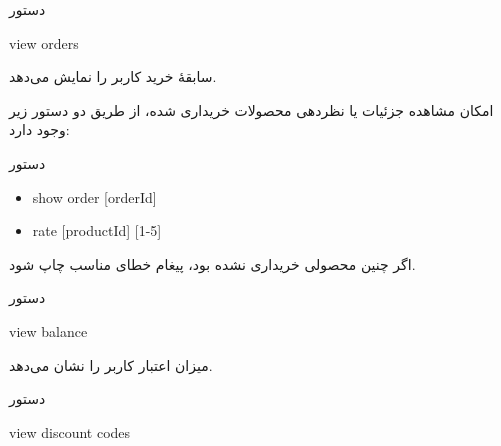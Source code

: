 \documentclass[]{article}
\begin{document}
\hrulefill


\begin{mybox}[colback=yellow]{دستور}

\begin{latin}

view orders

\end{latin}

\end{mybox}

سابقۀ خرید کاربر را نمایش می‌دهد.

امکان مشاهده جزئیات یا نظردهی محصولات خریداری شده، از طریق دو دستور زیر وجود دارد:

\begin{mybox}[colback=brilliantlavender]{دستور}

\begin{latin}

\begin{itemize}[label = {$\Rightarrow$}]

\item
show order [orderId]

\item
rate [productId] [1-5]

\end{itemize}

\end{latin}

\end{mybox}

اگر چنین محصولی خریداری نشده بود، پیغام خطای مناسب چاپ شود.

\hrulefill


\begin{mybox}[colback=yellow]{دستور}

\begin{latin}

view balance

\end{latin}

\end{mybox}

میزان اعتبار کاربر را نشان می‌دهد.

\hrulefill


\begin{mybox}[colback=yellow]{دستور}

\begin{latin}

view discount codes

\end{latin}

\end{mybox}
\end{document}
